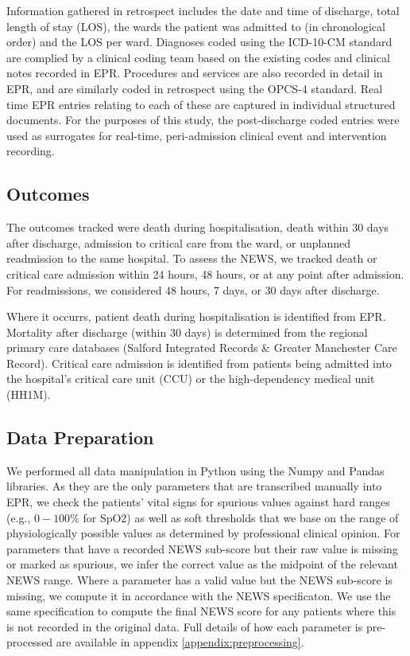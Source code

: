 \documentclass[10pt,journal, compsoc]{IEEEtran}
\begin{document}
Information gathered in retrospect includes the date and time of discharge, total length of stay (LOS), the wards the patient was admitted to (in chronological order) and the LOS per ward. Diagnoses coded using the ICD-10-CM standard are complied by a clinical coding team based on the existing codes and clinical notes recorded in EPR. Procedures and services are also recorded in detail in EPR, and are similarly coded in retrospect using the OPCS-4 standard. Real time EPR entries relating to each of these are captured in individual structured documents. For the purposes of this study, the post-discharge coded entries were used as surrogates for real-time, peri-admission clinical event and intervention recording.

\subsection{Outcomes} The outcomes tracked were death during hospitalisation, death within 30 days after discharge, admission to critical care from the ward, or unplanned readmission to the same hospital. To assess the NEWS, we tracked death or critical care admission within 24 hours, 48 hours, or at any point after admission. For readmissions, we considered 48 hours, 7 days, or 30 days after discharge.

Where it occurrs, patient death during hospitalisation is identified from EPR. Mortality after discharge (within 30 days) is determined from the regional primary care databases (Salford Integrated Records \& Greater Manchester Care Record). Critical care admission is identified from patients being admitted into the hospital's critical care unit (CCU) or the high-dependency medical unit (HH1M).

\subsection{Data Preparation} We performed all data manipulation in Python using the Numpy and Pandas libraries. As they are the only parameters that are transcribed manually into EPR, we check the patients' vital signs for spurious values against hard ranges (e.g., $0-100\%$ for SpO2) as well as soft thresholds that we base on the range of physiologically possible values as determined by professional clinical opinion. For parameters that have a recorded NEWS sub-score but their raw value is missing or marked as spurious, we infer the correct value as the midpoint of the relevant NEWS range. Where a parameter has a valid value but the NEWS sub-score is missing, we compute it in accordance with the NEWS specificaton. We use the same specification to compute the final NEWS score for any patients where this is not recorded in the original data. Full details of how each parameter is pre-processed are available in appendix \ref{appendix:preprocessing}.
\end{document}

